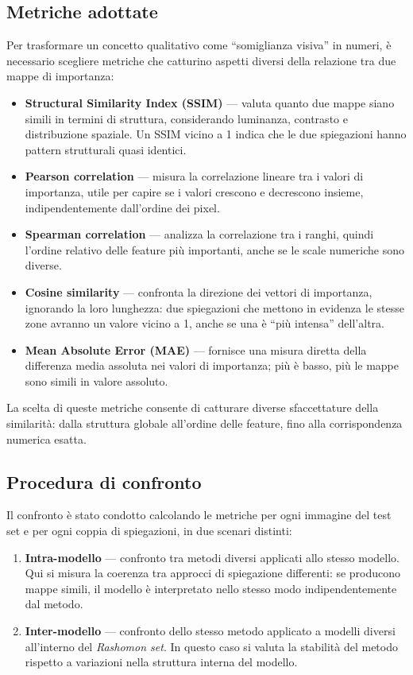 \documentclass{article}
\begin{document}
\subsection{Metriche adottate}
Per trasformare un concetto qualitativo come ``somiglianza visiva'' in numeri,
è necessario scegliere metriche che catturino aspetti diversi della relazione
tra due mappe di importanza:

\begin{itemize}
      \item \textbf{Structural Similarity Index (SSIM)} — valuta quanto due mappe siano simili in termini di struttura, considerando luminanza, contrasto e distribuzione spaziale. Un SSIM vicino a 1 indica che le due spiegazioni hanno pattern strutturali quasi identici.
      \item \textbf{Pearson correlation} — misura la correlazione lineare tra i valori di importanza, utile per capire se i valori crescono e decrescono insieme, indipendentemente dall’ordine dei pixel.
      \item \textbf{Spearman correlation} — analizza la correlazione tra i ranghi, quindi l’ordine relativo delle feature più importanti, anche se le scale numeriche sono diverse.
      \item \textbf{Cosine similarity} — confronta la direzione dei vettori di importanza, ignorando la loro lunghezza: due spiegazioni che mettono in evidenza le stesse zone avranno un valore vicino a 1, anche se una è “più intensa” dell’altra.
      \item \textbf{Mean Absolute Error (MAE)} — fornisce una misura diretta della differenza media assoluta nei valori di importanza; più è basso, più le mappe sono simili in valore assoluto.
\end{itemize}

La scelta di queste metriche consente di catturare diverse sfaccettature della
similarità: dalla struttura globale all’ordine delle feature, fino alla
corrispondenza numerica esatta.

\subsection{Procedura di confronto}
Il confronto è stato condotto calcolando le metriche per ogni immagine del test
set e per ogni coppia di spiegazioni, in due scenari distinti:

\begin{enumerate}
      \item \textbf{Intra-modello} — confronto tra metodi diversi applicati allo stesso modello. Qui si misura la coerenza tra approcci di spiegazione differenti: se producono mappe simili, il modello è interpretato nello stesso modo indipendentemente dal metodo.
      \item \textbf{Inter-modello} — confronto dello stesso metodo applicato a modelli diversi all’interno del \emph{Rashomon set}. In questo caso si valuta la stabilità del metodo rispetto a variazioni nella struttura interna del modello.
\end{enumerate}
\end{document}
